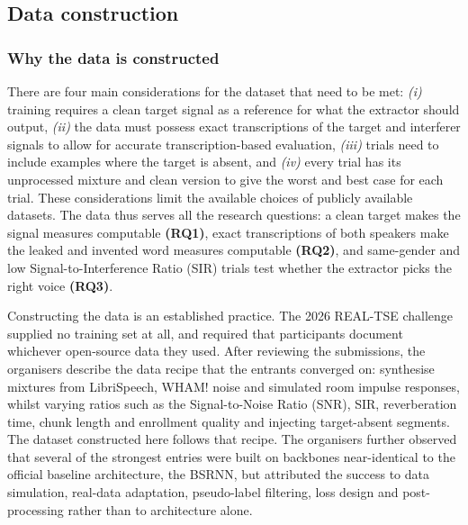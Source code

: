 \subsection{Data construction}
\label{sec:data}

\subsubsection{Why the data is constructed}
\label{sec:construct}
There are four main considerations for the dataset that need to be met: \textit{(i)} training requires a clean target signal as a reference for what the extractor should output, \textit{(ii)} the data must possess exact transcriptions of the target and interferer signals to allow for accurate transcription-based evaluation, \textit{(iii)} trials need to include examples where the target is absent, and \textit{(iv)} every trial has its unprocessed mixture and clean version to give the worst and best case for each trial. These considerations limit the available choices of publicly available datasets. The data thus serves all the research questions: a clean target makes the signal measures computable \textbf{(RQ1)}, exact transcriptions of both speakers make the leaked and invented word measures computable \textbf{(RQ2)}, and same-gender and low Signal-to-Interference Ratio (SIR) trials test whether the extractor picks the right voice \textbf{(RQ3)}.

Constructing the data is an established practice. The 2026 REAL-TSE challenge \cite{wang2026realtse} supplied no training set at all, and required that participants document whichever open-source data they used. After reviewing the submissions, the organisers describe the data recipe that the entrants converged on: synthesise mixtures from LibriSpeech, WHAM! noise and simulated room impulse responses, whilst varying ratios such as the Signal-to-Noise Ratio (SNR), SIR, reverberation time, chunk length and enrollment quality and injecting target-absent segments. The dataset constructed here follows that recipe. The organisers further observed that several of the strongest entries were built on backbones near-identical to the official baseline architecture, the BSRNN, but attributed the success to data simulation, real-data adaptation, pseudo-label filtering, loss design and post-processing rather than to architecture alone.    

